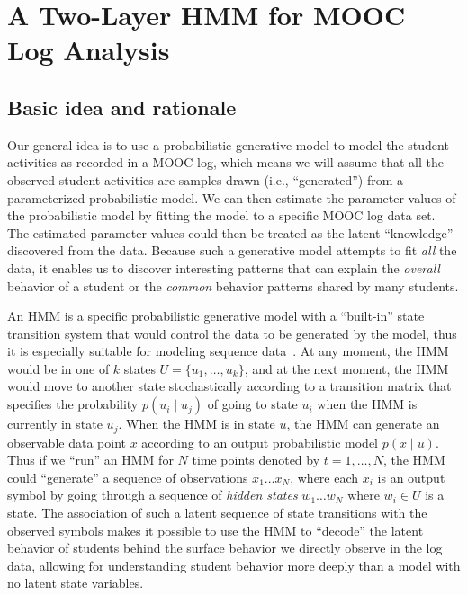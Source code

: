 \section{A Two-Layer HMM for MOOC Log Analysis}

\subsection{Basic idea and rationale}

Our general idea is to use a probabilistic generative model to model the
student activities as recorded in a MOOC log, which means we will assume
that all the observed student activities are samples drawn (i.e.,
``generated'') from a parameterized probabilistic model. We can then
estimate the parameter values of the probabilistic model by fitting the
model to a specific MOOC log data set. The estimated parameter values could
then be treated as the latent ``knowledge'' discovered from the data.
Because such a generative model attempts to fit \emph{all} the data, it
enables us to discover interesting patterns that can explain the
\emph{overall} behavior of a student or the \emph{common} behavior patterns
shared by many students.

An HMM is a specific probabilistic generative model with a ``built-in''
state transition system that would control the data to be generated by the
model, thus it is especially suitable for modeling sequence
data~\cite{Rabiner:1990:RSR, Huang:1990:HMM}. At any moment, the HMM would
be in one of $k$ states $U=\{u_1,\ldots,u_k\}$, and at the next moment, the
HMM would move to another state stochastically according to a transition
matrix that specifies the probability $p(u_i \mid u_j)$ of going to state
$u_i$ when the HMM is currently in state $u_j$. When the HMM is in state
$u$, the HMM can generate an observable data point $x$ according to an
output probabilistic model $p(x \mid u)$. Thus if we ``run'' an HMM for $N$
time points denoted by $t=1,\ldots,N$, the HMM could ``generate'' a sequence
of observations $x_1 \ldots x_N$, where each $x_i$ is an output symbol by
going through a sequence of \emph{hidden states} $w_1 \ldots w_N$ where
$w_i \in U$ is a state. The association of such a latent sequence of state
transitions with the observed symbols makes it possible to use the HMM to
``decode'' the latent behavior of students behind the surface behavior we
directly observe in the log data, allowing for understanding student
behavior more deeply than a model with no latent state variables.

